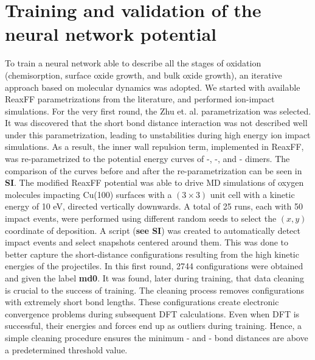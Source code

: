 \message{ !name(paper.tex)}\documentclass[manuscript=cmatex]{achemso}
\begin{document}
\section{Training and validation of the neural network potential}
To train a neural network able to describe all the stages of oxidation (chemisorption, surface oxide growth, and bulk oxide growth), an iterative approach based on molecular dynamics was adopted. We started with available ReaxFF parametrizations from the literature, and performed ion-impact simulations. For the very first round, the Zhu et. al. \cite{zhu_development_2020} parametrization was selected. It was discovered that the short bond distance interaction was not described well under this parametrization, leading to unstabilities during high energy ion impact simulations. As a result, the inner wall repulsion term, implemented in ReaxFF, was re-parametrized to the potential energy curves of -, -, and - dimers. The comparison of the curves before and after the re-parametrization can be seen in \textbf{SI}. The modified ReaxFF potential was able to drive MD simulations of oxygen molecules impacting Cu(100) surfaces with a $(3\times3)$ unit cell with a kinetic energy of 10 eV, directed vertically downwards. A total of 25 runs, each with 50 impact events, were performed using different random seeds to select the $(x, y)$ coordinate of  deposition. A script (\textbf{see SI}) was created to automatically detect impact events and select snapshots centered around them. This was done to better capture the short-distance configurations resulting from the high kinetic energies of the projectiles. In this first round, 2744 configurations were obtained and given the label \textbf{md0}. It was found, later during training, that data cleaning is crucial to the success of training. The cleaning process removes configurations with extremely short bond lengths. These configurations create electronic convergence problems during subsequent DFT calculations. Even when DFT is successful, their energies and forces end up as outliers during training. Hence, a simple cleaning procedure ensures the minimum - and - bond distances are above a predetermined threshold value.
\end{document}
